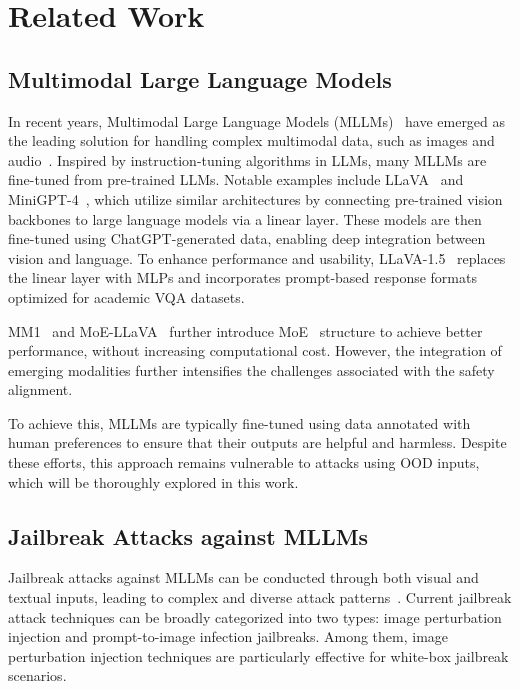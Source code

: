 \section{Related Work}
\label{sec:related}

\subsection{Multimodal Large Language Models}



In recent years, Multimodal Large Language Models (MLLMs)~\cite{wang2024comprehensive} have emerged as the leading solution for handling complex multimodal data, such as images\cite{zhang2024vision} and audio~\cite{fathullah2024prompting}. 
Inspired by instruction-tuning algorithms in LLMs, many MLLMs are fine-tuned from pre-trained LLMs. Notable examples include LLaVA~\cite{liu2024visual} and MiniGPT-4~\cite{zhu2023minigpt}, which utilize similar architectures by connecting pre-trained vision backbones to large language models via a linear layer. These models are then fine-tuned using ChatGPT-generated data, enabling deep integration between vision and language. To enhance performance and usability, LLaVA-1.5~\cite{liu2024improved} replaces the linear layer with MLPs and incorporates prompt-based response formats optimized for academic VQA datasets. 

MM1~\cite{mckinzie2024mm1} and MoE-LLaVA~\cite{lin2024moe} further introduce MoE~\cite{shazeer2017outrageously} structure to achieve better performance, without increasing computational cost.
However, the integration of emerging modalities further intensifies the challenges associated with the safety alignment. 

To achieve this, MLLMs are typically fine-tuned using data annotated with human preferences to ensure that their outputs are helpful and harmless. Despite these efforts, this approach remains vulnerable to attacks using OOD inputs, which will be thoroughly explored in this work. 




\subsection{Jailbreak Attacks against MLLMs}
Jailbreak attacks against MLLMs can be conducted through both visual and textual inputs, leading to complex and diverse attack patterns~\cite{jin2024jailbreakzoo,niu2024jailbreaking}.
Current jailbreak attack techniques can be broadly categorized into two types: image perturbation injection and prompt-to-image infection jailbreaks. 
Among them, image perturbation injection techniques are particularly effective for white-box jailbreak scenarios.
 
